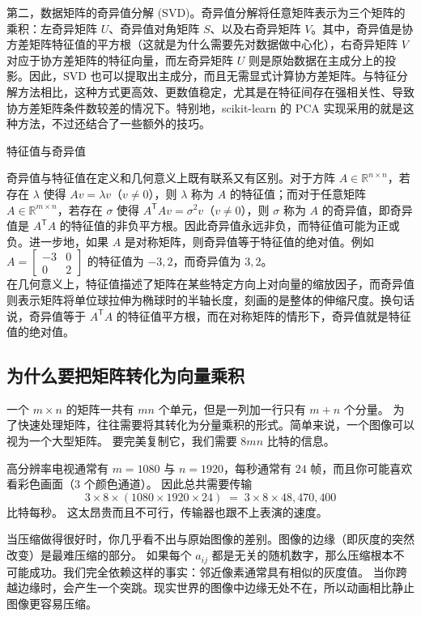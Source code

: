 第二，数据矩阵的奇异值分解 (SVD)。奇异值分解将任意矩阵表示为三个矩阵的乘积：左奇异矩阵 $U$、奇异值对角矩阵 $S$、以及右奇异矩阵 $V$。其中，奇异值是协方差矩阵特征值的平方根（这就是为什么需要先对数据做中心化），右奇异矩阵 $V$ 对应于协方差矩阵的特征向量，而左奇异矩阵 $U$ 则是原始数据在主成分上的投影。因此，SVD 也可以提取出主成分，而且无需显式计算协方差矩阵。与特征分解方法相比，这种方式更高效、更数值稳定，尤其是在特征间存在强相关性、导致协方差矩阵条件数较差的情况下。特别地，scikit-learn 的 PCA 实现采用的就是这种方法，不过还结合了一些额外的技巧。
\begin{dxtips}{特征值与奇异值}
    

奇异值与特征值在定义和几何意义上既有联系又有区别。对于方阵 $A \in \mathbb{R}^{n\times n}$，若存在 $\lambda$ 使得 $Av=\lambda v$（$v\neq 0$），则 $\lambda$ 称为 $A$ 的特征值；而对于任意矩阵 $A \in \mathbb{R}^{m\times n}$，若存在 $\sigma$ 使得 $A^{\mathsf T} A v=\sigma^2 v$（$v\neq 0$），则 $\sigma$ 称为 $A$ 的奇异值，即奇异值是 $A^{\mathsf T}A$ 的特征值的非负平方根。因此奇异值永远非负，而特征值可能为正或负。进一步地，如果 $A$ 是对称矩阵，则奇异值等于特征值的绝对值。例如 $A=\begin{bmatrix}-3&0\\0&2\end{bmatrix}$ 的特征值为 $-3,2$，而奇异值为 $3,2$。\\在几何意义上，特征值描述了矩阵在某些特定方向上对向量的缩放因子，而奇异值则表示矩阵将单位球拉伸为椭球时的半轴长度，刻画的是整体的伸缩尺度。换句话说，奇异值等于 $A^{\mathsf T}A$ 的特征值平方根，而在对称矩阵的情形下，奇异值就是特征值的绝对值。
\end{dxtips}
\subsection{为什么要把矩阵转化为向量乘积}

一个 $m\times n$ 的矩阵一共有 $mn$ 个单元，但是一列加一行只有 $m+n$ 个分量。  
为了快速处理矩阵，往往需要将其转化为分量乘积的形式。简单来说，一个图像可以视为一个大型矩阵。  
要完美复制它，我们需要 $8mn$ 比特的信息。  

高分辨率电视通常有 $m=1080$ 与 $n=1920$，每秒通常有 $24$ 帧，而且你可能喜欢看彩色画面（$3$ 个颜色通道）。  
因此总共需要传输
\[
3 \times 8 \times (1080 \times 1920 \times 24) \;=\; 3\times 8 \times 48,470,400
\]
比特每秒。  
这太昂贵而且不可行，传输器也跟不上表演的速度。  

当压缩做得很好时，你几乎看不出与原始图像的差别。图像的边缘（即灰度的突然改变）是最难压缩的部分。  
如果每个 $a_{ij}$ 都是无关的随机数字，那么压缩根本不可能成功。我们完全依赖这样的事实：邻近像素通常具有相似的灰度值。  
当你跨越边缘时，会产生一个突跳。现实世界的图像中边缘无处不在，所以动画相比静止图像更容易压缩。\\
